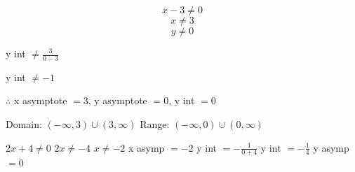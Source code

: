\documentclass{report}
\begin{document}
$$x-3 \neq 0$$
$$x \neq 3$$
$$y \neq 0$$
\begin{center} y int $\neq\frac{3}{0-3}$\end{center}
\begin{center} y int $\neq-1$\end{center}
\begin{center}
    $\therefore$ x asymptote $= 3$, y asymptote $= 0$, y int $= 0$
\end{center}
\begin{center}   
    Domain:
    \newline
    $(-\infty, 3)\cup(3,\infty) $
    \newline
    Range:
    \newline
    $(-\infty,0)\cup(0,\infty)$
\end{center}
\newpage
{}
\begin{center}
    $2x+4 \neq 0$
    \newline
    $2x \neq -4$
    \newline
    $x \neq -2$
    \newline
    x asymp $= -2$
    \newline
    y int $= -\frac{1}{0+4}$
    \newline
    y int $= -\frac{1}{4}$
    \newline
    y asymp $= 0$

\end{center}
\end{document}
